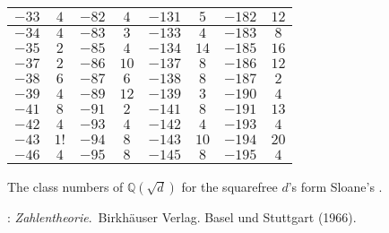 \documentclass[12pt]{article}
\theoremstyle{definition}
\begin{document}
\begin{center}
\begin{tabular}{||c|c||c|c||c|c||c|c||}
\hline
$-33$ & $4$ & $-82$ & $4$ & $-131$ & $5$& $-182$ & $12$\\
\hline
$-34$ & $4$ & $-83$ & $3$ & $-133$ & $4$& $-183$ & $8$\\
\hline
$-35$ & $2$ & $-85$ & $4$ & $-134$ & $14$& $-185$ & $16$\\
\hline
$-37$ & $2$ & $-86$ & $10$ & $-137$ & $8$& $-186$ & $12$\\
\hline
$-38$ & $6$ & $-87$ & $6$ & $-138$ & $8$& $-187$ & $2$\\
\hline
$-39$ & $4$ & $-89$ & $12$ & $-139$ & $3$& $-190$ & $4$\\
\hline
$-41$ & $8$ & $-91$ & $2$ & $-141$ & $8$& $-191$ & $13$\\
\hline
$-42$ & $4$ & $-93$ & $4$ & $-142$ & $4$& $-193$ & $4$\\
\hline
$-43$ & $1!$ & $-94$ & $8$ & $-143$ & $10$& $-194$ & $20$\\
\hline
$-46$ & $4$ & $-95$ & $8$ & $-145$ & $8$& $-195$ & $4$\\
\hline
\end{tabular}
\end{center}

The class numbers of $\mathbb{Q}(\sqrt{d})$ for the squarefree $d$'s form Sloane's .

\begin{thebibliography}{9}
: {\em Zahlentheorie}.\, Birkh\"auser Verlag. Basel und Stuttgart (1966).
\end{thebibliography}

\end{document}

